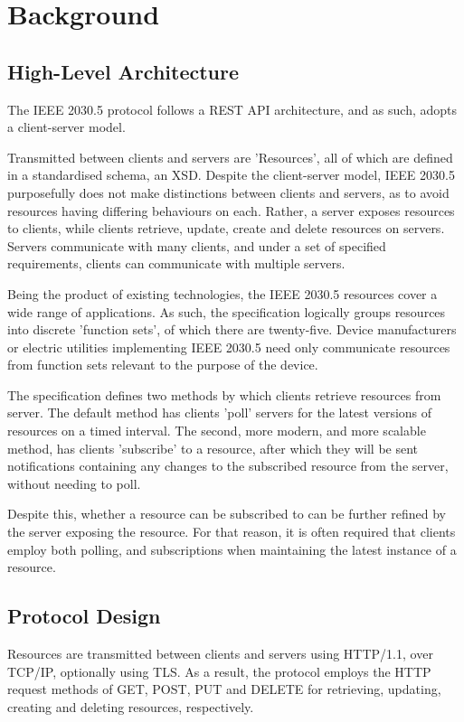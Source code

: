 \chapter{Background}\label{ch:background}

\section{High-Level Architecture}
The IEEE 2030.5 protocol follows a REST API architecture, and as such, adopts a client-server model.

Transmitted between clients and servers are 'Resources', all of which are defined in a standardised schema, an XSD. 
Despite the client-server model, IEEE 2030.5 purposefully does not make distinctions between clients and servers, as to avoid resources having differing behaviours on each. Rather, a server exposes resources to clients, while clients retrieve, update, create and delete resources on servers.
Servers communicate with many clients, and under a set of specified requirements, clients can communicate with multiple servers.

Being the product of existing technologies, the IEEE 2030.5 resources cover a wide range of applications. As such, the specification logically groups resources into discrete 'function sets', of which there are twenty-five. 
Device manufacturers or electric utilities implementing IEEE 2030.5 need only communicate resources from function sets relevant to the purpose of the device. 

The specification defines two methods by which clients retrieve resources from server. The default method has clients 'poll' servers for the latest versions of resources on a timed interval.
The second, more modern, and more scalable method, has clients 'subscribe' to a resource, after which they will be sent notifications containing any changes to the subscribed resource from the server, without needing to poll.

Despite this, whether a resource can be subscribed to can be further refined by the server exposing the resource.
For that reason, it is often required that clients employ both polling, and subscriptions when maintaining the latest instance of a resource. \cite{AUSDOE} 
\cite{IEEE2030.5}

\section{Protocol Design}
Resources are transmitted between clients and servers using HTTP/1.1, over TCP/IP, optionally using TLS.
As a result, the protocol employs the HTTP request methods of GET, POST, PUT and DELETE for retrieving, updating, creating and deleting resources, respectively.

